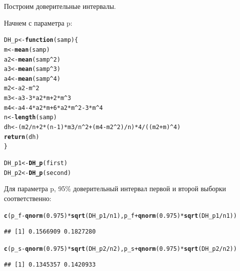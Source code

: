\documentclass{article}\usepackage[]{graphicx}\usepackage[]{color}
\makeatletter
\newcommand{\hlnum}[1]{\textcolor[rgb]{0.686,0.059,0.569}{#1}}%
\newcommand{\hlopt}[1]{\textcolor[rgb]{0,0,0}{#1}}%
\newcommand{\hlstd}[1]{\textcolor[rgb]{0.345,0.345,0.345}{#1}}%
\newcommand{\hlkwa}[1]{\textcolor[rgb]{0.161,0.373,0.58}{\textbf{#1}}}%
\newcommand{\hlkwb}[1]{\textcolor[rgb]{0.69,0.353,0.396}{#1}}%
\newcommand{\hlkwc}[1]{\textcolor[rgb]{0.333,0.667,0.333}{#1}}%
\newcommand{\hlkwd}[1]{\textcolor[rgb]{0.737,0.353,0.396}{\textbf{#1}}}%
\newenvironment{kframe}{%
 \def\at@end@of@kframe{}%
 \ifinner\ifhmode%
  \def\at@end@of@kframe{\end{minipage}}%
  \begin{minipage}{\columnwidth}%
 \fi\fi%
 \def\FrameCommand##1{\hskip\@totalleftmargin \hskip-\fboxsep
 \colorbox{shadecolor}{##1}\hskip-\fboxsep
     \hskip-\linewidth \hskip-\@totalleftmargin \hskip\columnwidth}%
 \MakeFramed {\advance\hsize-\width
   \@totalleftmargin\z@ \linewidth\hsize
   \@setminipage}}%
 {\par\unskip\endMakeFramed%
 \at@end@of@kframe}
\newenvironment{knitrout}{}{} %
\makeatother
\begin{document}
Построим доверительные интервалы.

Начнем с параметра p:
\begin{knitrout}
\color{fgcolor}\begin{kframe}
\begin{alltt}
\hlstd{DH_p} \hlkwb{<-} \hlkwa{function}\hlstd{(}\hlkwc{samp}\hlstd{)\{}
  \hlstd{m} \hlkwb{<-} \hlkwd{mean}\hlstd{(samp)}
  \hlstd{a2} \hlkwb{<-} \hlkwd{mean}\hlstd{(samp}\hlopt{^}\hlnum{2}\hlstd{)}
  \hlstd{a3} \hlkwb{<-} \hlkwd{mean}\hlstd{(samp}\hlopt{^}\hlnum{3}\hlstd{)}
  \hlstd{a4} \hlkwb{<-} \hlkwd{mean}\hlstd{(samp}\hlopt{^}\hlnum{4}\hlstd{)}
  \hlstd{m2} \hlkwb{<-} \hlstd{a2} \hlopt{-} \hlstd{m}\hlopt{^}\hlnum{2}
  \hlstd{m3} \hlkwb{<-} \hlstd{a3} \hlopt{-} \hlnum{3} \hlopt{*} \hlstd{a2} \hlopt{*} \hlstd{m} \hlopt{+} \hlnum{2} \hlopt{*} \hlstd{m}\hlopt{^}\hlnum{3}
  \hlstd{m4} \hlkwb{<-} \hlstd{a4} \hlopt{-} \hlnum{4} \hlopt{*} \hlstd{a2} \hlopt{*} \hlstd{m} \hlopt{+} \hlnum{6} \hlopt{*} \hlstd{a2} \hlopt{*} \hlstd{m}\hlopt{^}\hlnum{2} \hlopt{-} \hlnum{3} \hlopt{*} \hlstd{m}\hlopt{^}\hlnum{4}
  \hlstd{n} \hlkwb{<-} \hlkwd{length}\hlstd{(samp)}
  \hlstd{dh} \hlkwb{<-} \hlstd{(m2} \hlopt{/} \hlstd{n} \hlopt{+} \hlnum{2} \hlopt{*} \hlstd{(n} \hlopt{-} \hlnum{1}\hlstd{)} \hlopt{*} \hlstd{m3} \hlopt{/} \hlstd{n}\hlopt{^}\hlnum{2} \hlopt{+} \hlstd{(m4} \hlopt{-} \hlstd{m2}\hlopt{^}\hlnum{2}\hlstd{)} \hlopt{/} \hlstd{n)} \hlopt{*} \hlnum{4} \hlopt{/} \hlstd{((m2} \hlopt{+} \hlstd{m)}\hlopt{^}\hlnum{4}\hlstd{)}
  \hlkwd{return}\hlstd{(dh)}
\hlstd{\}}

\hlstd{DH_p1} \hlkwb{<-} \hlkwd{DH_p}\hlstd{(first)}
\hlstd{DH_p2} \hlkwb{<-} \hlkwd{DH_p}\hlstd{(second)}
\end{alltt}
\end{kframe}
\end{knitrout}

Для параметра p, 95\% доверительный интервал первой и второй выборки соответственно:

\begin{knitrout}
\color{fgcolor}\begin{kframe}
\begin{alltt}
\hlkwd{c}\hlstd{(p_f} \hlopt{-} \hlkwd{qnorm}\hlstd{(}\hlnum{0.975}\hlstd{)}\hlopt{*}\hlkwd{sqrt}\hlstd{(DH_p1} \hlopt{/} \hlstd{n1), p_f} \hlopt{+} \hlkwd{qnorm}\hlstd{(}\hlnum{0.975}\hlstd{)}\hlopt{*}\hlkwd{sqrt}\hlstd{(DH_p1} \hlopt{/} \hlstd{n1))}
\end{alltt}
\begin{verbatim}
## [1] 0.1566909 0.1827280
\end{verbatim}
\begin{alltt}
\hlkwd{c}\hlstd{(p_s} \hlopt{-} \hlkwd{qnorm}\hlstd{(}\hlnum{0.975}\hlstd{)}\hlopt{*}\hlkwd{sqrt}\hlstd{(DH_p2} \hlopt{/} \hlstd{n2), p_s} \hlopt{+} \hlkwd{qnorm}\hlstd{(}\hlnum{0.975}\hlstd{)}\hlopt{*}\hlkwd{sqrt}\hlstd{(DH_p2} \hlopt{/} \hlstd{n2))}
\end{alltt}
\begin{verbatim}
## [1] 0.1345357 0.1420933
\end{verbatim}
\end{kframe}
\end{knitrout}
\end{document}
